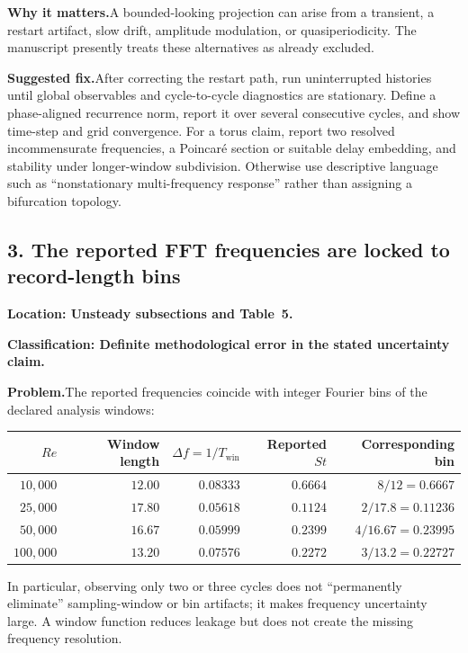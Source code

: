 \documentclass[11pt]{article}
\newcommand{\classification}[1]{\par\noindent\textbf{Classification: #1.}\par}
\newcommand{\location}[1]{\textbf{Location: #1}}
\newcommand{\problem}{\noindent\textbf{Problem.}\hspace{0.35em}}
\newcommand{\importance}{\par\noindent\textbf{Why it matters.}\hspace{0.35em}}
\newcommand{\fix}{\par\noindent\textbf{Suggested fix.}\hspace{0.35em}}
\begin{document}
\importance A bounded-looking projection can arise from a transient, a restart artifact, slow drift, amplitude modulation, or quasiperiodicity.  The manuscript presently treats these alternatives as already excluded.

\fix After correcting the restart path, run uninterrupted histories until global observables and cycle-to-cycle diagnostics are stationary.  Define a phase-aligned recurrence norm, report it over several consecutive cycles, and show time-step and grid convergence.  For a torus claim, report two resolved incommensurate frequencies, a Poincar\'e section or suitable delay embedding, and stability under longer-window subdivision.  Otherwise use descriptive language such as ``nonstationary multi-frequency response'' rather than assigning a bifurcation topology.

\subsection*{3. The reported FFT frequencies are locked to record-length bins}

\location{Unsteady subsections and Table~5.}

\classification{Definite methodological error in the stated uncertainty claim}

\problem The reported frequencies coincide with integer Fourier bins of the declared analysis windows:

\begin{center}
\small
\begin{tabular}{@{}rrrrr@{}}
\toprule
$Re$ & Window length & $\Delta f=1/T_{\mathrm{win}}$ & Reported $St$ & Corresponding bin \\
\midrule
$10{,}000$  & $12.00$ & $0.08333$ & $0.6664$ & $8/12=0.6667$ \\
$25{,}000$  & $17.80$ & $0.05618$ & $0.1124$ & $2/17.8=0.11236$ \\
$50{,}000$  & $16.67$ & $0.05999$ & $0.2399$ & $4/16.67=0.23995$ \\
$100{,}000$ & $13.20$ & $0.07576$ & $0.2272$ & $3/13.2=0.22727$ \\
\bottomrule
\end{tabular}
\end{center}

In particular, observing only two or three cycles does not ``permanently eliminate'' sampling-window or bin artifacts; it makes frequency uncertainty large.  A window function reduces leakage but does not create the missing frequency resolution.
\end{document}
